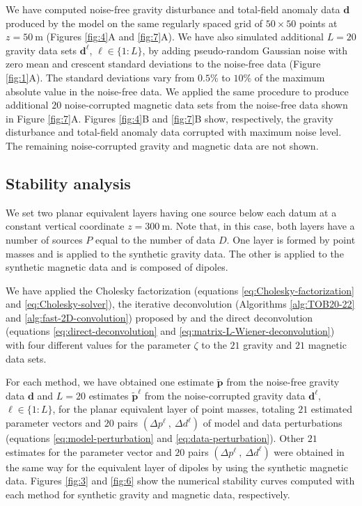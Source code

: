 We have computed noise-free gravity disturbance and total-field anomaly data $\mathbf{d}$ produced by the
model on the same regularly spaced grid of $50 \times 50$ points at $z = 50 \: \mathrm{m}$
(Figures \ref{fig:4}A and \ref{fig:7}A).
We have also simulated additional $L = 20$ gravity data sets $\mathbf{d}^{\ell}$, $\ell \in \{1:L\}$, 
by adding pseudo-random Gaussian noise 
with zero mean and crescent standard deviations to the noise-free data (Figure \ref{fig:1}A).
The standard deviations vary from $0.5\%$ to $10\%$ of the maximum absolute value in the noise-free data.
We applied the same procedure to produce additional $20$ noise-corrupted magnetic data sets from the
noise-free data shown in Figure \ref{fig:7}A.
Figures \ref{fig:4}B and \ref{fig:7}B show, respectively, the gravity disturbance and total-field anomaly data 
corrupted with maximum noise level.
The remaining noise-corrupted gravity and magnetic data are not shown.

\subsection{Stability analysis}

We set two planar equivalent layers having one source below each datum at a constant vertical coordinate $z = 300 \: \mathrm{m}$.
Note that, in this case, both layers have a number of sources $P$ equal to the number of data $D$.
One layer is formed by point masses and is applied to the synthetic gravity data.
The other is applied to the synthetic magnetic data and is composed of dipoles.

We have applied the Cholesky factorization (equations \ref{eq:Cholesky-factorization} and \ref{eq:Cholesky-solver}), 
the iterative deconvolution (Algorithms \ref{alg:TOB20-22} and \ref{alg:fast-2D-convolution}) proposed by 
\citet{takahashi-etal2020, takahashi-etal2022} and the direct deconvolution (equations \ref{eq:direct-deconvolution} and \ref{eq:matrix-L-Wiener-deconvolution})
with four different values for the parameter $\zeta$ to the $21$ gravity and $21$ magnetic data sets.

For each method, we have obtained one estimate $\tilde{\mathbf{p}}$ from the noise-free gravity data $\mathbf{d}$
and $L=20$ estimates $\tilde{\mathbf{p}}^{\ell}$ from the noise-corrupted gravity data $\mathbf{d}^{\ell}$, $\ell \in \{1:L\}$,
for the planar equivalent layer of point masses, totaling $21$ estimated parameter vectors and 
$20$ pairs $\left( \Delta p^{\ell} \: , \: \Delta d^{\ell} \right)$ of model and data perturbations
(equations \ref{eq:model-perturbation} and \ref{eq:data-perturbation}).
Other $21$ estimates for the parameter vector and 
$20$ pairs $\left( \Delta p^{\ell} \: , \: \Delta d^{\ell} \right)$ were obtained in the same way for the 
equivalent layer of dipoles by using the synthetic magnetic data.
Figures \ref{fig:3} and \ref{fig:6} show the numerical stability curves computed with each method for 
synthetic gravity and magnetic data, respectively.

